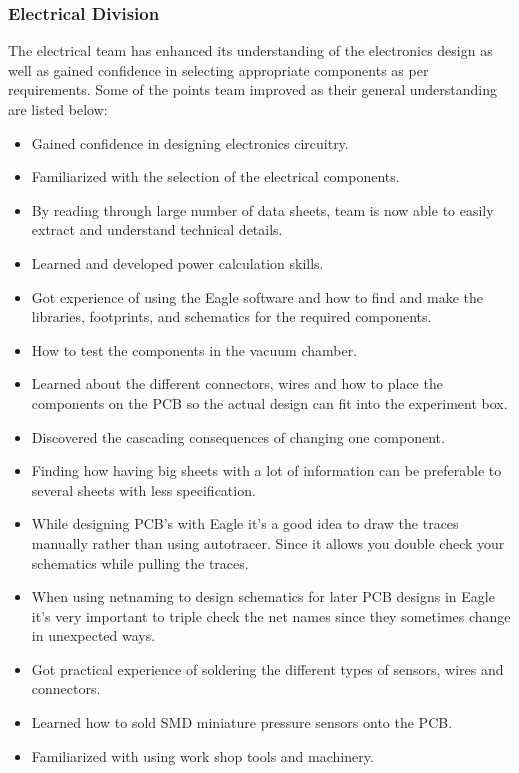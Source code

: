 \subsubsection{Electrical Division}
The electrical team has enhanced its understanding of the electronics design as well as gained confidence in selecting appropriate components as per requirements. Some of the points team improved as their general understanding are listed below:  
\begin{itemize}

    \item Gained confidence in designing electronics circuitry.
    \item Familiarized with the selection of the electrical components. 
    \item By reading through large number of data sheets, team is now able to easily extract and understand technical details. 
    \item Learned and developed power calculation skills.
    \item Got experience of using the Eagle software and how to find and make the libraries, footprints, and schematics for the required components.
    \item How to test the components in the vacuum chamber.
    \item Learned about the different connectors, wires and how to place the components on the PCB so the actual design can fit into the experiment box.
    \item Discovered the cascading consequences of changing one component.
    \item Finding how having big sheets with a lot of information can be preferable to several sheets with less specification.
    \item While designing PCB's with Eagle it's a good idea to draw the traces manually rather than using autotracer. Since it allows you double check your schematics while pulling the traces.
    \item When using netnaming to design schematics for later PCB designs in Eagle it's very important to triple check the net names since they sometimes change in unexpected ways.
    \item Got practical experience of soldering the different types of sensors, wires and connectors. 
    \item Learned how to sold SMD miniature pressure sensors onto the PCB.
    \item Familiarized with using work shop tools and machinery.
    
\end{itemize}


